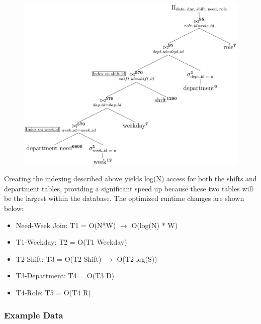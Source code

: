 \documentclass[letter,12pt]{texMemo}
\begin{document}
\begin{figure}[H]
	\centering
	\includegraphics[width=.75\textwidth]{query2_indexed.png}
\end{figure}
Creating the indexing described above yields log(N) access for both the shifts and department tables, providing a significant speed up because these two tables will be the largest within the database. The optimized runtime changes are shown below:
\begin{itemize}[noitemsep,nolistsep]
	\item Need-Week Join: T1 = O(N*W) $\rightarrow$ O(log(N) * W)
	\item T1-Weekday: T2 = O(T1 Weekday)
	\item T2-Shift: T3 = O(T2 Shift) $\rightarrow$ O(T2 log(S))
	\item T3-Department: T4 = O(T3 D)
	\item T4-Role: T5 = O(T4 R)
\end{itemize}

\vspace{1em}
\subsubsection*{Example Data}
\lstset{style=smallstyle}
	\begin{center}
		
	\end{center}
\lstset{style=mystyle}

\end{document}
